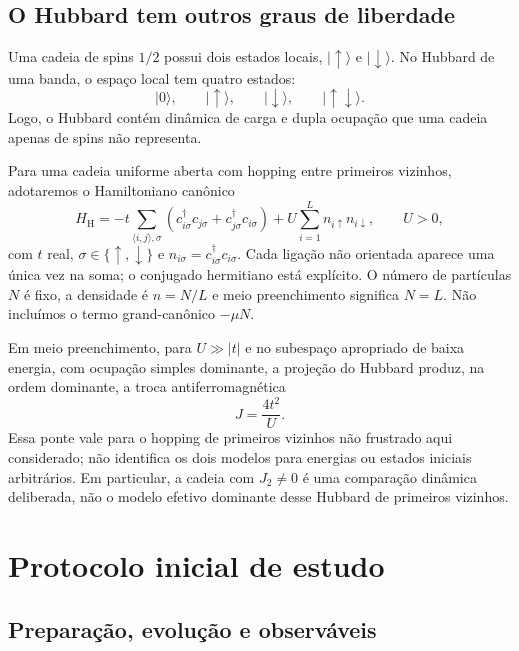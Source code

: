 \documentclass[a4paper,11pt]{article}
\begin{document}
\subsection{O Hubbard tem outros graus de liberdade}

Uma cadeia de spins $1/2$ possui dois estados locais,
$|\uparrow\rangle$ e $|\downarrow\rangle$. No Hubbard de uma banda,
o espaço local tem quatro estados:
\[
  |0\rangle,\qquad |\uparrow\rangle,\qquad
  |\downarrow\rangle,\qquad |\uparrow\downarrow\rangle.
\]
Logo, o Hubbard contém dinâmica de carga e dupla ocupação que uma
cadeia apenas de spins não representa.

Para uma cadeia uniforme aberta com hopping entre primeiros vizinhos,
adotaremos o Hamiltoniano canônico
\begin{equation}
  H_{\mathrm H} =
  -t\sum_{\langle i,j\rangle,\sigma}
  \left(c^\dagger_{i\sigma}c_{j\sigma}
        +c^\dagger_{j\sigma}c_{i\sigma}\right)
  +U\sum_{i=1}^{L}n_{i\uparrow}n_{i\downarrow},
  \qquad U>0,
  \label{eq:hubbard}
\end{equation}
com $t$ real, $\sigma\in\{\uparrow,\downarrow\}$ e
$n_{i\sigma}=c^\dagger_{i\sigma}c_{i\sigma}$. Cada ligação não orientada
aparece uma única vez na soma; o conjugado hermitiano está explícito.
O número de partículas $N$ é fixo, a densidade é $n=N/L$ e meio
preenchimento significa $N=L$. Não incluímos o termo grand-canônico
$-\mu N$.

Em meio preenchimento, para $U\gg |t|$ e no subespaço apropriado de baixa
energia, com ocupação simples dominante, a projeção do Hubbard produz,
na ordem dominante, a troca antiferromagnética
\begin{equation}
  J=\frac{4t^2}{U}.
\end{equation}
Essa ponte vale para o hopping de primeiros vizinhos não frustrado aqui
considerado; não identifica os dois modelos para energias ou estados
iniciais arbitrários. Em particular, a cadeia com $J_2\ne0$ é uma
comparação dinâmica deliberada, não o modelo efetivo dominante desse
Hubbard de primeiros vizinhos.

\newpage
\section{Protocolo inicial de estudo}

\subsection{Preparação, evolução e observáveis}
\end{document}
